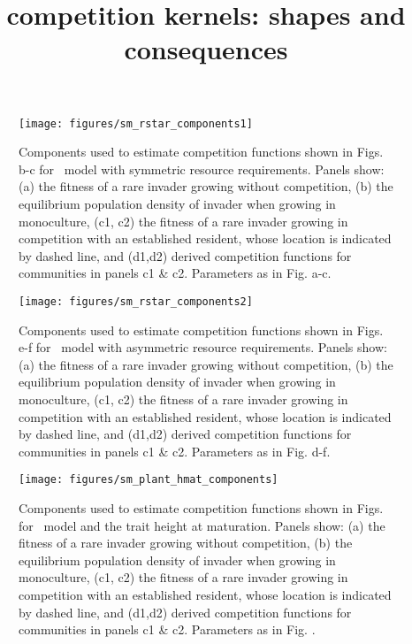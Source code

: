 \documentclass[10pt,twoside]{article}
\title{competition kernels: shapes and consequences}
\date{}
\begin{document}
\maketitle

\setcounter{secnumdepth}{1}

\begin{figure}[h]
 \centering
 \texttt{[image: figures/sm\_rstar\_components1]}
 \caption{Components used to estimate competition functions shown in Figs.
 {\figRstar}b-c for \Rstar\ model with symmetric resource requirements.
  Panels show: (a) the fitness of a rare invader growing without competition,
  (b) the equilibrium population density of invader when growing in monoculture,
  (c1, c2) the fitness of a rare invader growing in competition with an established
  resident, whose location is indicated by dashed line, and (d1,d2) derived competition
  functions for communities in panels  c1 \& c2. Parameters as in Fig.
  {\figRstar}a-c.}
  \label{fig:sm_rstar_components1}
\end{figure}

\begin{figure}[h]
 \centering
 \texttt{[image: figures/sm\_rstar\_components2]}
 \caption{Components used to estimate competition functions shown in Figs.
 {\figRstar}e-f for \Rstar\ model with asymmetric resource requirements.
  Panels show: (a) the fitness of a rare invader growing without competition,
  (b) the equilibrium population density of invader when growing in monoculture,
  (c1, c2) the fitness of a rare invader growing in competition with an established
  resident, whose location is indicated by dashed line, and (d1,d2) derived competition
  functions for communities in panels c1 \& c2. Parameters as in Fig.
  {\figRstar}d-f.}
  \label{fig:sm_rstar_components2}
\end{figure}

\begin{figure}[h]
 \centering
 \texttt{[image: figures/sm\_plant\_hmat\_components]}
 \caption{Components used to estimate competition functions shown in Figs.
 {\figPlantHmat} for \plant\ model and the trait height at maturation.
  Panels show: (a) the fitness of a rare invader growing without competition,
  (b) the equilibrium population density of invader when growing in monoculture,
  (c1, c2) the fitness of a rare invader growing in competition with an established
  resident, whose location is indicated by dashed line, and (d1,d2) derived competition
  functions for communities in panels c1 \& c2. Parameters as in Fig.
  {\figPlantHmat}.}
  \label{fig:sm_plant_hmat_components}
\end{figure}
\end{document}
